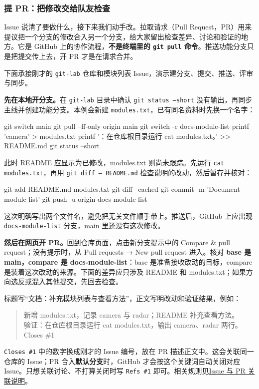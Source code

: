 \subsubsection{提 PR：把修改交给队友检查}
\label{sec:git-pr}
Issue 说清了要做什么，接下来我们动手改。拉取请求（Pull Request，PR）用来提议把一个分支的修改合入另一个分支，给大家留出检查差异、讨论和验证的地方。它是 GitHub 上的协作流程，\textbf{不是终端里的 \texttt{git pull} 命令}。推送功能分支只是把提交传上去，开 PR 才是在请求合并。
\begin{example}
下面承接刚才的 \texttt{git-lab} 仓库和模块列表 Issue，演示建分支、提交、推送、评审与同步。

\textbf{先在本地开分支。}在 \texttt{git-lab} 目录中确认 \texttt{git status --short} 没有输出，再同步主线并创建功能分支。本例会新建 \texttt{modules.txt}，已有同名资料时先换一个名字：
\begin{tbash}
git switch main
git pull --ff-only origin main
git switch -c docs-module-list
printf 'camera\nradar\n' > modules.txt
printf '：在仓库根目录运行 cat modules.txt。\n' >> README.md
git status --short
\end{tbash}
此时 README 应显示为已修改，modules.txt 则尚未跟踪。先运行 \texttt{cat modules.txt}，再用 \texttt{git diff -- README.md} 检查说明的改动，然后暂存并核对：
\begin{tbash}
git add README.md modules.txt
git diff --cached
git commit -m 'Document module list'
git push -u origin docs-module-list
\end{tbash}
这次明确写出两个文件名，避免把无关文件顺手带上。推送后，GitHub 上应出现 \texttt{docs-module-list} 分支，main 里还没有这次修改。

\textbf{然后在网页开 PR。}回到仓库页面，点击新分支提示中的 Compare \& pull request；没有提示时，从 Pull requests → New pull request 进入。核对 \textbf{base 是 main，compare 是 docs-module-list}：base 是准备接收改动的目标，compare 是装着这次改动的来源。下面的差异应只涉及 README 和 modules.txt；如果方向选反或混入其他提交，先回去检查。

标题写“文档：补充模块列表与查看方法”，正文写明改动和验证结果，例如：
\begin{quote}
新增 modules.txt，记录 camera 与 radar；README 补充查看方法。\\
验证：在仓库根目录运行 cat modules.txt，输出 camera、radar 两行。\\
Closes \#1
\end{quote}
\texttt{Closes \#1} 中的数字换成刚才的 Issue 编号，放在 PR 描述正文中。这会关联同一仓库的 Issue；PR 合入\textbf{默认分支}时，GitHub 才会按这个关键词自动关闭对应 Issue。只想关联讨论、不打算关闭时写 \texttt{Refs \#1} 即可。相关规则见\href{https://docs.github.com/en/issues/tracking-your-work-with-issues/using-issues/linking-a-pull-request-to-an-issue}{Issue 与 PR 关联说明}。


\end{example}
